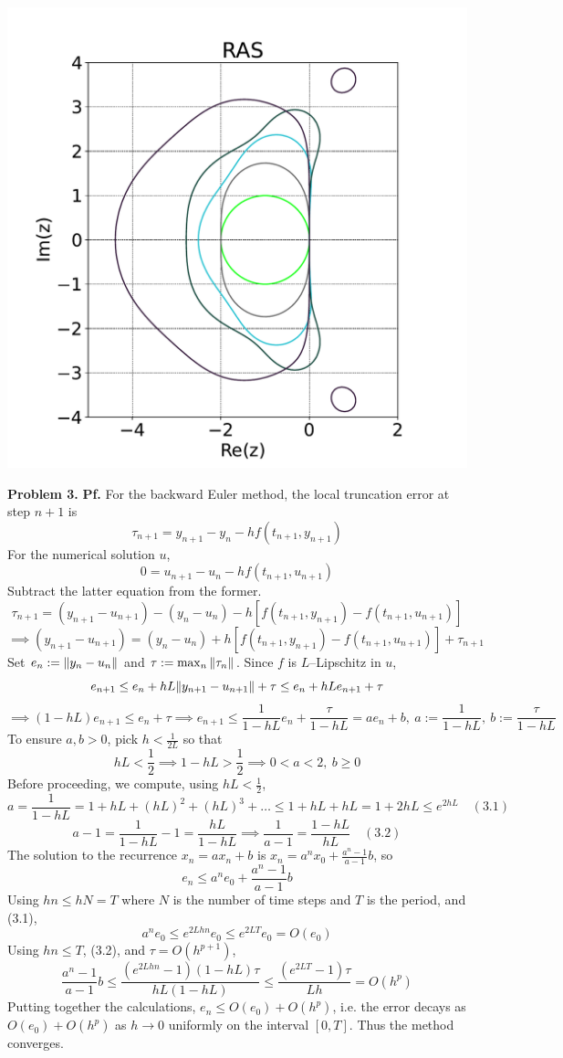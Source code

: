 \documentclass{article}
\def\tbf#1{\textbf{#1}}
\newcommand{\pf}{\tbf{Pf. }}
\newcommand{\imp}{\implies}
\newcommand{\sep}[1][.5cm]{\vspace{#1}}
\begin{document}
\begin{center}
	\includegraphics[scale=.35]{hw2 problem 2 RAS}
\end{center}
\sep



\tbf{Problem 3.} \pf For the backward Euler method, the local truncation error at step $n+1$ is
$$\tau_{n+1} = y_{n+1} - y_n - hf(t_{n+1},y_{n+1})$$
For the numerical solution $u$,
$$0 = u_{n+1} - u_n - hf(t_{n+1},u_{n+1})$$
Subtract the latter equation from the former.
$$\tau_{n+1} = (y_{n+1}-u_{n+1}) - (y_n-u_n) - h[f(t_{n+1},y_{n+1})-f(t_{n+1},u_{n+1})]$$
$$\imp (y_{n+1}-u_{n+1}) = (y_n-u_n) + h[f(t_{n+1},y_{n+1})-f(t_{n+1},u_{n+1})] + \tau_{n+1}$$
Set $e_n:=\norm{y_n-u_n}$ and $\tau:=\max_n\norm{\tau_n}$. Since $f$ is $L$--Lipschitz in $u$,
$$e_{n+1} \le e_n + hL\norm{y_{n+1}-u_{n+1}} + \tau \le e_n + hLe_{n+1} + \tau$$
$$\imp (1-hL)e_{n+1} \le e_n + \tau
\imp e_{n+1} \le \frac{1}{1-hL}e_n + \frac{\tau}{1-hL} = ae_n + b,~a:=\frac{1}{1-hL},~b:=\frac{\tau}{1-hL}$$
To ensure $a,b>0$, pick $h<\frac{1}{2L}$ so that
$$hL < \frac12 \imp 1-hL > \frac12 \imp 0 < a < 2,~b\ge0$$
Before proceeding, we compute, using $hL<\frac12$,
$$a = \frac{1}{1-hL} = 1 + hL + (hL)^2 + (hL)^3 + \dots \le 1 + hL + hL = 1 + 2hL \le e^{2hL} \quad (3.1)$$
$$a - 1 = \frac{1}{1-hL} - 1 = \frac{hL}{1-hL} \imp \frac{1}{a-1} = \frac{1-hL}{hL} \quad (3.2)$$
The solution to the recurrence $x_n=ax_n+b$ is $x_n=a^nx_0+\frac{a^n-1}{a-1}b$, so
$$e_n \le a^ne_0 + \frac{a^n-1}{a-1}b$$
Using $hn\le hN=T$ where $N$ is the number of time steps and $T$ is the period, and (3.1),
$$a^ne_0 \le e^{2Lhn}e_0 \le e^{2LT}e_0 = O(e_0)$$
Using $hn\le T$, (3.2), and $\tau=O(h^{p+1})$,
$$\frac{a^n-1}{a-1}b \le \frac{(e^{2Lhn}-1)(1-hL)\tau}{hL(1-hL)} \le \frac{(e^{2LT}-1)\tau}{Lh} = O(h^p)$$
Putting together the calculations, $e_n\le O(e_0)+O(h^p)$, i.e. the error decays as $O(e_0)+O(h^p)$ as $h\to0$ uniformly on the interval $[0,T]$. Thus the method converges.
\end{document}
